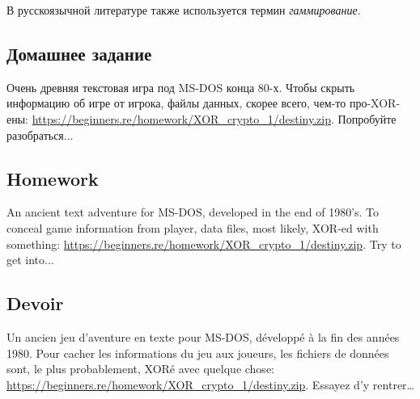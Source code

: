﻿
\label{simple_XOR_encryption}

\ifdefined\RUSSIAN
В русскоязычной литературе также используется термин \emph{гаммирование}.
\fi

\EN{}
\FR{}
\DE{}

\EN{}
\RU{}
\FR{}

\EN{}
\RU{}
\FR{}

\EN{}
\RU{}
\FR{}

\EN{}
\RU{}
\FR{}

\ifdefined\RUSSIAN
\subsection{Домашнее задание}

Очень древняя текстовая игра под MS-DOS конца 80-х.
Чтобы скрыть информацию об игре от игрока, файлы данных, скорее всего, чем-то про-XOR-ены:
\url{https://beginners.re/homework/XOR_crypto_1/destiny.zip}.
Попробуйте разобраться...
\fi

\ifdefined\ENGLISH
\subsection{Homework}

An ancient text adventure for MS-DOS, developed in the end of 1980's.
To conceal game information from player, data files, most likely, XOR-ed with something:
\url{https://beginners.re/homework/XOR_crypto_1/destiny.zip}.
Try to get into...
\fi

\ifdefined\FRENCH
\subsection{Devoir}

Un ancien jeu d'aventure en texte pour MS-DOS, développé à la fin des années 1980.
Pour cacher les informations du jeu aux joueurs, les fichiers de données sont,
le plus probablement, XORé avec quelque chose:
\url{https://beginners.re/homework/XOR_crypto_1/destiny.zip}.
Essayez d'y rentrer\dots
\fi

